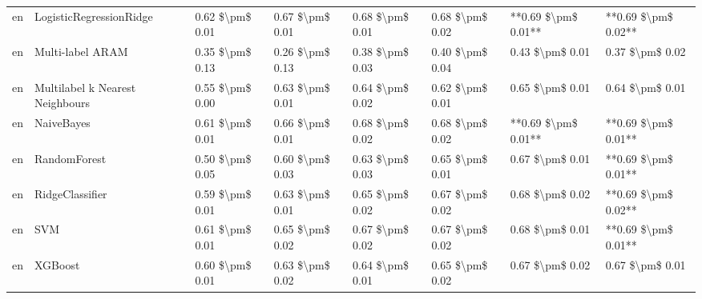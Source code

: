\begin{tabular}{llllllll}
      en &         LogisticRegressionRidge & 0.62 \$\textbackslash pm\$ 0.01 &           0.67 \$\textbackslash pm\$ 0.01 &       0.68 \$\textbackslash pm\$ 0.01 &        0.68 \$\textbackslash pm\$ 0.02 &                     **0.69 \$\textbackslash pm\$ 0.01** & **0.69 \$\textbackslash pm\$ 0.02** \\
      en &                Multi-label ARAM & 0.35 \$\textbackslash pm\$ 0.13 &           0.26 \$\textbackslash pm\$ 0.13 &       0.38 \$\textbackslash pm\$ 0.03 &        0.40 \$\textbackslash pm\$ 0.04 &                         0.43 \$\textbackslash pm\$ 0.01 &     0.37 \$\textbackslash pm\$ 0.02 \\
      en & Multilabel k Nearest Neighbours & 0.55 \$\textbackslash pm\$ 0.00 &           0.63 \$\textbackslash pm\$ 0.01 &       0.64 \$\textbackslash pm\$ 0.02 &        0.62 \$\textbackslash pm\$ 0.01 &                         0.65 \$\textbackslash pm\$ 0.01 &     0.64 \$\textbackslash pm\$ 0.01 \\
      en &                      NaiveBayes & 0.61 \$\textbackslash pm\$ 0.01 &           0.66 \$\textbackslash pm\$ 0.01 &       0.68 \$\textbackslash pm\$ 0.02 &        0.68 \$\textbackslash pm\$ 0.02 &                     **0.69 \$\textbackslash pm\$ 0.01** & **0.69 \$\textbackslash pm\$ 0.01** \\
      en &                    RandomForest & 0.50 \$\textbackslash pm\$ 0.05 &           0.60 \$\textbackslash pm\$ 0.03 &       0.63 \$\textbackslash pm\$ 0.03 &        0.65 \$\textbackslash pm\$ 0.01 &                         0.67 \$\textbackslash pm\$ 0.01 & **0.69 \$\textbackslash pm\$ 0.01** \\
      en &                 RidgeClassifier & 0.59 \$\textbackslash pm\$ 0.01 &           0.63 \$\textbackslash pm\$ 0.01 &       0.65 \$\textbackslash pm\$ 0.02 &        0.67 \$\textbackslash pm\$ 0.02 &                         0.68 \$\textbackslash pm\$ 0.02 & **0.69 \$\textbackslash pm\$ 0.02** \\
      en &                             SVM & 0.61 \$\textbackslash pm\$ 0.01 &           0.65 \$\textbackslash pm\$ 0.02 &       0.67 \$\textbackslash pm\$ 0.02 &        0.67 \$\textbackslash pm\$ 0.02 &                         0.68 \$\textbackslash pm\$ 0.01 & **0.69 \$\textbackslash pm\$ 0.01** \\
      en &                         XGBoost & 0.60 \$\textbackslash pm\$ 0.01 &           0.63 \$\textbackslash pm\$ 0.02 &       0.64 \$\textbackslash pm\$ 0.01 &        0.65 \$\textbackslash pm\$ 0.02 &                         0.67 \$\textbackslash pm\$ 0.02 &     0.67 \$\textbackslash pm\$ 0.01 \\

\end{tabular}
